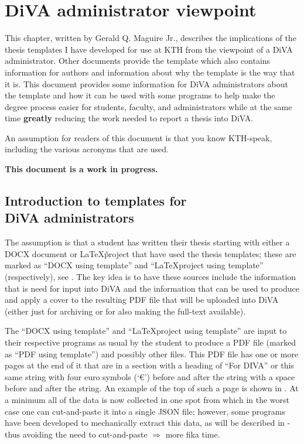 %
\chapter{DiVA administrator viewpoint}
\label{ch:adminViewpoint}

This chapter, written by Gerald Q. Maguire Jr.,  describes the implications of the thesis templates I have developed for use at KTH from the viewpoint of a DiVA administrator. Other documents provide the template which also contains information for authors and information about why the template is the way that it is. This document provides some information for DiVA administrators about the template and how it can be used with some programs to help make the degree process easier for students, faculty, and administrators while at the same time \textbf{greatly} reducing the work needed to report a thesis into DiVA.

An assumption for readers of this document is that you know KTH-speak, including the various acronyms that are used.

\textbf{This document is a work in progress.}

\section[Introduction to templates for DiVA administrators]{Introduction to templates for\\ DiVA administrators}

The assumption is that a student has written their thesis starting with either a DOCX document or \LaTeX\~project that have used the thesis templates; these are marked as ``DOCX using template'' and ``\LaTeX project using template'' (respectively), see . The key idea is to have these sources include  \first the information that is need for input into DiVA and \Second the information that can be used to produce and apply a cover to the resulting PDF file that will be uploaded into DiVA (either just for archiving or for also making the full-text available).

The ``DOCX using template'' and ``\LaTeX project using template'' are input to their respective programs as usual by the student to produce a PDF file (marked as ``PDF using template'') and possibly other files. This PDF file has one or more pages at the end of it that are in a section with a heading of ``For DIVA'' or this same string with four euro symbols (\ie `€') before and after the string with a space before and after the string. An example of the top of such a page is shown in .  At a minimum all of the data is now collected in one spot from which in the worst case one can cut-and-paste it into a single JSON file; however, some programs have been developed to mechanically extract this data, as will be described in  - thus avoiding the need to cut-and-paste $\Rightarrow$ more fika time.

